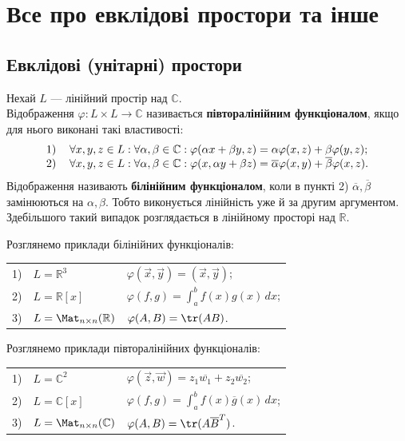 \documentclass{math_library}
\begin{document}
\newpage

\section{Все про евклідові простори та інше}
\subsection{Евклідові (унітарні) простори}
\begin{definition}
\label{def_sesquilinear_functional}
Нехай $L$ --- лінійний простір над $\mathbb{C}$.\\
Відображення $\varphi \colon L \times L \to \mathbb{C}$ називається \textbf{півторалінійним функціоналом}, якщо для нього виконані такі властивості:
\begin{align*}
\begin{tabular}{cl}
1) & $\forall x,y,z \in L: \forall \alpha,\beta \in \mathbb{C}: \varphi (\alpha x + \beta y, z) = \alpha \varphi (x,z) + \beta \varphi (y,z);$\\
2) & $\forall x,y,z \in L: \forall \alpha, \beta \in \mathbb{C}: \varphi (x, \alpha y + \beta z) = \overline{\alpha} \varphi (x,y) + \overline{\beta} \varphi (x,z).$\\
	\end{tabular}
\end{align*}
Відображення називають \textbf{білінійним функціоналом}, коли в пункті 2) $\overline{\alpha},\overline{\beta}$ замінюються на $\alpha,\beta$. Тобто виконується лінійність уже й за другим аргументом. Здебільшого такий випадок розглядається в лінійному просторі над $\mathbb{R}$.
\end{definition}

\begin{example}
\label{bilinear_functional}
Розглянемо приклади білінійних функціоналів:\\
\begin{tabular}{cll}
1) & $L = \mathbb{R}^3$ & $\varphi(\vec{x},\vec{y}) = (\vec{x},\vec{y})$;\\
2) & $L = \mathbb{R}[x]$ & $\varphi(f,g) = \displaystyle \int_a^b f(x)g(x)\,dx$;\\
3) & $L = \Mat_{n \times n}(\mathbb{R})$ & $\varphi(A,B) = \tr(AB)$.
\end{tabular}
\end{example}

\begin{example}
\label{one_half_functional}
Розглянемо приклади півторалінійних функціоналів:\\
\begin{tabular}{cll}
1) & $L = \mathbb{C}^2$ & $\varphi(\vec{z},\vec{w}) = z_1 \overline{w_1} + z_2 \overline{w_2}$;\\
2) & $L = \mathbb{C}[x]$ & $\varphi(f,g) = \displaystyle \int_a^b f(x) \overline{g}(x)\,dx$;\\
3) & $L = \Mat_{n \times n}(\mathbb{C})$ & $\varphi(A,B) = \tr(A \overline{B}^T)$.
\end{tabular}
\end{example}
\end{document}
